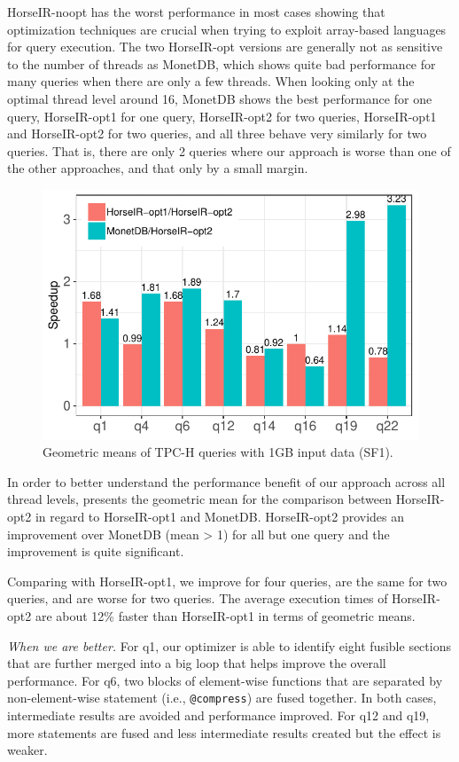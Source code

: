 HorseIR-noopt has the worst performance in most cases showing that optimization
techniques are crucial when trying to exploit array-based languages for query
execution. The two HorseIR-opt versions are generally not as sensitive to the
number of threads as MonetDB, which shows quite bad performance for many
queries when there are only a few threads. 
When looking only at the optimal thread level around 16, MonetDB shows the best
performance for one query, HorseIR-opt1 for one query, HorseIR-opt2 for two
queries, HorseIR-opt1 and HorseIR-opt2 for two queries, and all three behave
very similarly for two queries. That is, there are only 2 queries where our
approach is worse than one of the other approaches, and that only by a small
margin.

\begin{figure}[htbp]
\centering
\includegraphics[width=.9\columnwidth]{./src/figure/sf1-speedup.pdf}
\caption{Geometric means of TPC-H queries with 1GB input data (SF1).}
\label{fig:tpch_sf1_speedup}
\end{figure}

In order to better understand the performance benefit of our approach across all thread levels, 
  presents  the geometric mean for the comparison
between HorseIR-opt2 in regard to HorseIR-opt1 and MonetDB. 
HorseIR-opt2 provides an improvement over MonetDB (mean > 1) for all but one
query and the improvement is quite significant. 

Comparing with HorseIR-opt1, we improve for four queries, are the same for two
queries, and are worse for two queries. The average execution times of
HorseIR-opt2 are about 12\% faster than HorseIR-opt1 in terms of geometric
means.

\textit{When we are better.}
For q1, our optimizer is able to identify eight fusible sections that are
further merged into a big loop that helps improve the overall performance.
For q6, two blocks of element-wise functions that are separated by
non-element-wise statement (i.e., \texttt{@compress}) are fused together. In
both cases, intermediate results are avoided and performance improved.
For q12 and q19, more statements are fused and less intermediate results
created but the effect is weaker.

